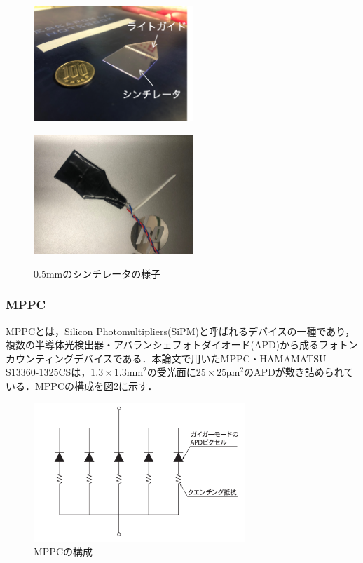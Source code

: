 \begin{figure}[h]
  \centering
  \begin{minipage}[b]{0.45\linewidth}
    \centering
    \includegraphics[width=6cm]{./figure/trigscin.png}
    \label{fig:scin}
  \end{minipage}
  \begin{minipage}[b]{0.45\linewidth}
    \centering
    \includegraphics[width=6cm]{./figure/trigscin1.png}
    \label{fig:trigscin}
  \end{minipage}
  \caption{0.5mmのシンチレータの様子}
  \label{fig:trigscin1}
\end{figure}


\subsubsection*{MPPC}
MPPCとは，Silicon Photomultipliers(SiPM)と呼ばれるデバイスの一種であり，複数の半導体光検出器・アバランシェフォトダイオード(APD)から成るフォトンカウンティングデバイスである．本論文で用いたMPPC・HAMAMATSU S13360-1325CSは，$1.3 \times 1.3 \mathrm{mm^2}$の受光面に$25 \times 25 \mathrm{\mu m^2}$のAPDが敷き詰められている．MPPCの構成を図\ref{fig:APD}に示す．

\begin{figure}[h]
  \centering
  \includegraphics[width=8cm]{./figure/apd.png}
  \caption{MPPCの構成\cite{03handbo69:online}}
  \label{fig:APD}
\end{figure}

